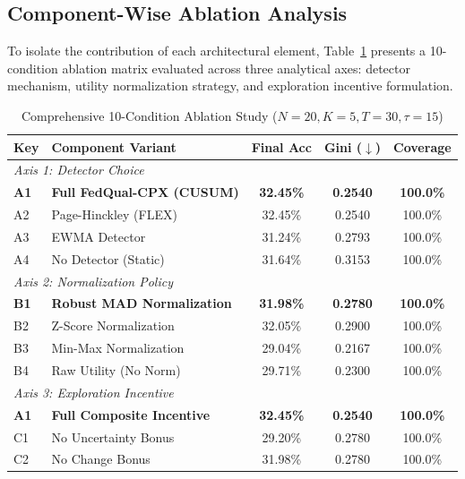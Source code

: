 \documentclass[journal,compsoc]{IEEEtran}
\begin{document}
\subsection{Component-Wise Ablation Analysis}
To isolate the contribution of each architectural element, Table~\ref{tab:ablation} presents a 10-condition ablation matrix evaluated across three analytical axes: detector mechanism, utility normalization strategy, and exploration incentive formulation.

\begin{table}[h]
\caption{Comprehensive 10-Condition Ablation Study ($N=20, K=5, T=30, \tau=15$)}
\label{tab:ablation}
\centering
\begin{tabular}{llccc}
\toprule
\textbf{Key} & \textbf{Component Variant} & \textbf{Final Acc} & \textbf{Gini ($\downarrow$)} & \textbf{Coverage} \\
\midrule
\multicolumn{5}{l}{\textit{Axis 1: Detector Choice}} \\
\textbf{A1} & \textbf{Full FedQual-CPX (CUSUM)} & \textbf{32.45\%} & \textbf{0.2540} & \textbf{100.0\%} \\
A2 & Page-Hinckley (FLEX) & 32.45\% & 0.2540 & 100.0\% \\
A3 & EWMA Detector & 31.24\% & 0.2793 & 100.0\% \\
A4 & No Detector (Static) & 31.64\% & 0.3153 & 100.0\% \\
\midrule
\multicolumn{5}{l}{\textit{Axis 2: Normalization Policy}} \\
\textbf{B1} & \textbf{Robust MAD Normalization} & \textbf{31.98\%} & \textbf{0.2780} & \textbf{100.0\%} \\
B2 & Z-Score Normalization & 32.05\% & 0.2900 & 100.0\% \\
B3 & Min-Max Normalization & 29.04\% & 0.2167 & 100.0\% \\
B4 & Raw Utility (No Norm) & 29.71\% & 0.2300 & 100.0\% \\
\midrule
\multicolumn{5}{l}{\textit{Axis 3: Exploration Incentive}} \\
\textbf{A1} & \textbf{Full Composite Incentive} & \textbf{32.45\%} & \textbf{0.2540} & \textbf{100.0\%} \\
C1 & No Uncertainty Bonus & 29.20\% & 0.2780 & 100.0\% \\
C2 & No Change Bonus & 31.98\% & 0.2780 & 100.0\% \\
\bottomrule
\end{tabular}
\end{table}
\end{document}
